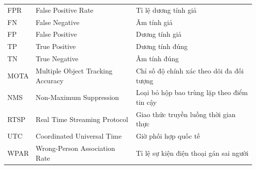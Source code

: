 \begin{longtable}{p{2.6cm}p{5.5cm}p{5.1cm}}
FPR & False Positive Rate & Tỉ lệ dương tính giả\\
FN & False Negative & Âm tính giả\\
FP & False Positive & Dương tính giả\\
TP & True Positive & Dương tính đúng\\
TN & True Negative & Âm tính đúng\\
MOTA & Multiple Object Tracking Accuracy & Chỉ số độ chính xác theo dõi đa đối tượng\\
NMS & Non-Maximum Suppression & Loại bỏ hộp bao trùng lặp theo điểm tin cậy\\
RTSP & Real Time Streaming Protocol & Giao thức truyền luồng thời gian thực\\
UTC & Coordinated Universal Time & Giờ phối hợp quốc tế\\
WPAR & Wrong-Person Association Rate & Tỉ lệ sự kiện điện thoại gán sai người\\
\end{longtable}
\endgroup
\clearpage
